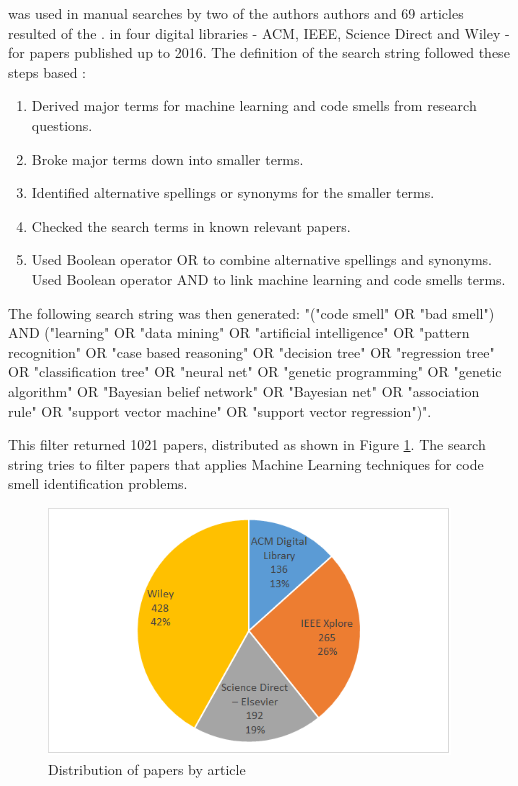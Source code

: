 was used in manual searches by two of the authors authors and 69 articles resulted of the .
in four digital libraries - ACM, IEEE, Science Direct and Wiley - for papers published up to 2016. The definition of the search string followed these steps based :
\begin{enumerate}
    \item{Derived major terms for machine learning and code smells from research questions.}
    \item{Broke major terms down into smaller terms.}
    \item{Identified alternative spellings or synonyms for the smaller terms.}
    \item{Checked the search terms in known relevant papers.}
    \item{Used Boolean operator OR to combine alternative spellings and synonyms. Used Boolean operator AND to link machine learning and code smells terms.}
\end{enumerate}

The following search string was then generated: "("code smell" OR "bad smell") AND ("learning" OR "data mining" OR "artificial intelligence" OR "pattern recognition" OR "case based reasoning" OR "decision tree" OR "regression tree" OR "classification tree" OR "neural net" OR "genetic programming" OR "genetic algorithm" OR "Bayesian belief network" OR "Bayesian net" OR "association rule" OR "support vector machine" OR "support vector regression")". 

This filter returned 1021 papers, distributed as shown in Figure \ref{fig:librariesImage}. The search string tries to filter papers that applies Machine Learning techniques for code smell identification problems.

\begin{figure}[hbt] 
	\caption{Distribution of papers by article}
	\label{fig:librariesImage}
	\includegraphics[width=0.95\textwidth]{imagens/librariesDistributionImage.png}
\end{figure}

